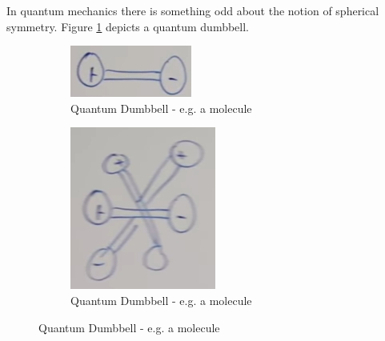 \documentclass[]{article}
\begin{document}
In quantum mechanics there is something odd about  the notion of spherical symmetry. Figure \ref{fig:aqm-8-qm-dumbbell} depicts a quantum dumbbell.
\begin{figure}[H]
	\caption{Quantum Dumbbells and electric dipoles}
	\begin{subfigure}[t]{0.3\textwidth}
		\caption{Quantum Dumbbell - e.g. a molecule}\label{fig:aqm-8-qm-dumbbell}
		\includegraphics[width=\textwidth]{aqm-8-qm-dumbbell}
	\end{subfigure}
	\begin{subfigure}[t]{0.3\textwidth}
		\caption{Quantum Dumbbell - e.g. a molecule}\label{fig:aqm-8-qm-dumbbell-superposition}
		\includegraphics[width=\textwidth]{aqm-8-qm-dumbbell-superposition}

\end{subfigure}
\end{figure}
\end{document}
